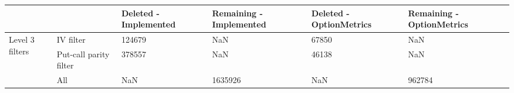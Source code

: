 \begin{tabular}{llllll}
\toprule
 &  & Deleted - Implemented & Remaining - Implemented & Deleted - OptionMetrics & Remaining - OptionMetrics \\
\midrule
\multirow[t]{3}{*}{Level 3 filters} & IV filter & 124679 & NaN & 67850 & NaN \\
 & Put-call parity filter & 378557 & NaN & 46138 & NaN \\
 & All & NaN & 1635926 & NaN & 962784 \\
\cline{1-6}
\bottomrule
\end{tabular}
